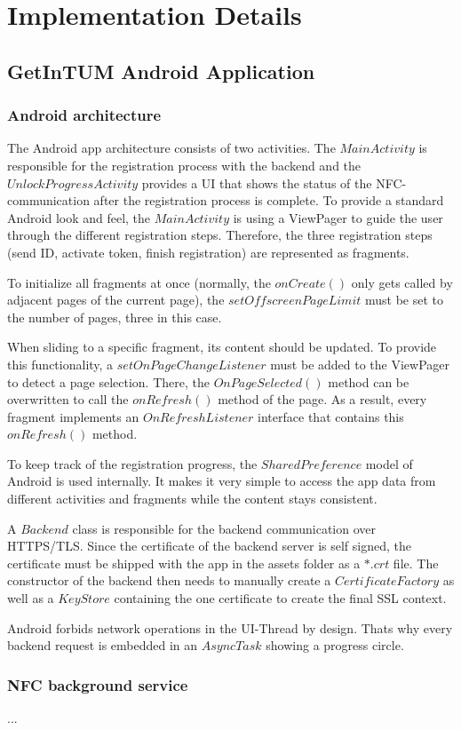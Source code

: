 \section{Implementation Details}\label{sec:impl}

\subsection{GetInTUM Android Application}\label{sec:android}


\subsubsection{Android architecture}
The Android app architecture consists of two activities. The $MainActivity$ is responsible for the registration process with the backend and the $UnlockProgressActivity$ provides a UI that shows the status of the NFC-communication after the registration process is complete. To provide a standard Android look and feel, the $MainActivity$ is using a ViewPager to guide the user through the different registration steps. Therefore, the three registration steps (send ID, activate token, finish registration) are represented as fragments.

To initialize all fragments at once (normally, the $onCreate()$ only gets called by adjacent pages of the current page), the $setOffscreenPageLimit$ must be set to the number of pages, three in this case.

When sliding to a specific fragment, its content should be updated. To provide this functionality, a $setOnPageChangeListener$ must be added to the ViewPager to detect a page selection. There, the $OnPageSelected()$ method can be overwritten to call the $onRefresh()$ method of the page. As a result, every fragment implements an $OnRefreshListener$ interface that contains this $onRefresh()$ method.

To keep track of the registration progress, the $SharedPreference$ model of Android is used internally. It makes it very simple to access the app data from different activities and fragments while the content stays consistent.

A $Backend$ class is responsible for the backend communication over HTTPS/TLS. Since the certificate of the backend server is self signed, the certificate must be shipped with the app in the assets folder as a $*.crt$ file. The constructor of the backend then needs to manually create a $CertificateFactory$ as well as a $KeyStore$ containing the one certificate to create the final SSL context.

Android forbids network operations in the UI-Thread by design. Thats why every backend request is embedded in an $AsyncTask$ showing a progress circle.

\subsubsection{NFC background service}
...